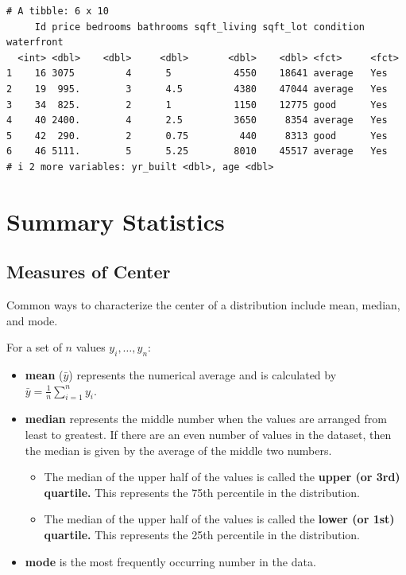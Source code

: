 \documentclass[
  letterpaper,
  DIV=11,
  numbers=noendperiod]{scrreprt}
\begin{document}
\begin{verbatim}
# A tibble: 6 x 10
     Id price bedrooms bathrooms sqft_living sqft_lot condition waterfront
  <int> <dbl>    <dbl>     <dbl>       <dbl>    <dbl> <fct>     <fct>     
1    16 3075         4      5           4550    18641 average   Yes       
2    19  995.        3      4.5         4380    47044 average   Yes       
3    34  825.        2      1           1150    12775 good      Yes       
4    40 2400.        4      2.5         3650     8354 average   Yes       
5    42  290.        2      0.75         440     8313 good      Yes       
6    46 5111.        5      5.25        8010    45517 average   Yes       
# i 2 more variables: yr_built <dbl>, age <dbl>
\end{verbatim}

\section{Summary Statistics}\label{summary-statistics}

\subsection{Measures of Center}\label{measures-of-center}

Common ways to characterize the center of a distribution include mean,
median, and mode.

For a set of \(n\) values \(y_i, \ldots, y_n\):

\begin{itemize}
\item
  \textbf{mean} (\(\bar{y}\)) represents the numerical average and is
  calculated by \(\bar{y} =\frac{1}{n}\displaystyle\sum_{i=1}^n y_i\).
\item
  \textbf{median} represents the middle number when the values are
  arranged from least to greatest. If there are an even number of values
  in the dataset, then the median is given by the average of the middle
  two numbers.

  \begin{itemize}
  \item
    The median of the upper half of the values is called the
    \textbf{upper (or 3rd) quartile.} This represents the 75th
    percentile in the distribution.
  \item
    The median of the upper half of the values is called the
    \textbf{lower (or 1st) quartile.} This represents the 25th
    percentile in the distribution.
  \end{itemize}
\item
  \textbf{mode} is the most frequently occurring number in the data.
\end{itemize}
\end{document}
